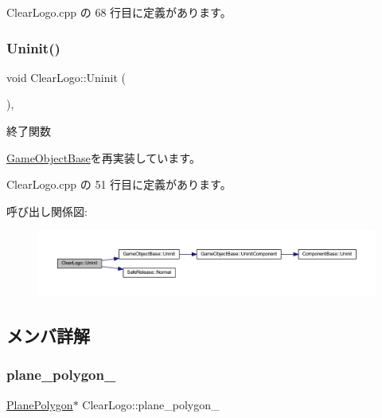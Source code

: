 Clear\+Logo.\+cpp の 68 行目に定義があります。

\mbox{\label{class_clear_logo_ab55def116615b92a8e8cc40b364b7a4c}} 
\subsubsection{\texorpdfstring{Uninit()}{Uninit()}}
{\footnotesize\ttfamily void Clear\+Logo\+::\+Uninit (\begin{DoxyParamCaption}{ }\end{DoxyParamCaption})\hspace{0.3cm}{\ttfamily [override]}, {\ttfamily [virtual]}}



終了関数 



\mbox{\hyperlink{class_game_object_base_a97e1bc277d7b1c0156d4735de29a022c}{Game\+Object\+Base}}を再実装しています。



 Clear\+Logo.\+cpp の 51 行目に定義があります。

呼び出し関係図\+:\nopagebreak
\begin{figure}[H]
\begin{center}
\leavevmode
\includegraphics[width=350pt]{class_clear_logo_ab55def116615b92a8e8cc40b364b7a4c_cgraph}
\end{center}
\end{figure}


\subsection{メンバ詳解}
\mbox{\label{class_clear_logo_ad4c1abbd7e501cc44357c9f65e12482f}} 
\subsubsection{\texorpdfstring{plane\+\_\+polygon\+\_\+}{plane\_polygon\_}}
{\footnotesize\ttfamily \mbox{\hyperlink{class_plane_polygon}{Plane\+Polygon}}$\ast$ Clear\+Logo\+::plane\+\_\+polygon\+\_\+}



